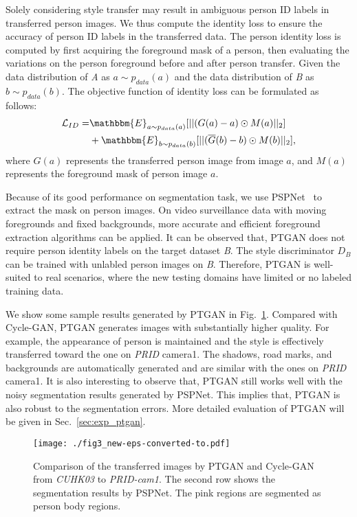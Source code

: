 \documentclass[10pt,twocolumn,letterpaper]{article}
\begin{document}
Solely considering style transfer may result in ambiguous person ID labels in transferred person images. We thus compute the identity loss to ensure the accuracy of person ID labels in the transferred data. The person identity loss is computed by first acquiring the foreground mask of a person, then evaluating the variations on the person foreground before and after person transfer. Given the data distribution of \emph{A} as $a \sim p_{data}(a)$ and the data distribution of \emph{B} as $b \sim p_{data}(b)$. The objective function of identity loss can be formulated as follows:
\begin{equation}
\begin{split}
\mathcal{L}_{ID} = &\mathbbm{E}_{a \sim p_{data}(a)}[||(G(a)-a) \odot M(a)||_2]\\
&+ \mathbbm{E}_{b \sim p_{data}(b)}[||(\overline{G}(b)-b) \odot M(b)||_2],
\end{split}
\end{equation}
where $G(a)$ represents the transferred person image from image $a$, and $M(a)$ represents the foreground mask of person image $a$.

Because of its good performance on segmentation task, we use PSPNet~\cite{zhao2017pspnet} to extract the mask on person images. On video surveillance data with moving foregrounds and fixed backgrounds, more accurate and efficient foreground extraction algorithms can be applied. It can be observed that, PTGAN does not require person identity labels on the target dataset \emph{B}. The style discriminator $D_B$ can be trained with unlabled person images on \emph{B}. Therefore, PTGAN is well-suited to real scenarios, where the new testing domains have limited or no labeled training data.

We show some sample results generated by PTGAN in Fig.~\ref{fig:fig3}. Compared with Cycle-GAN, PTGAN generates images with substantially higher quality. For example, the appearance of person is maintained and the style is effectively transferred toward the one on \emph{PRID} camera1. The shadows, road marks, and backgrounds are automatically generated and are similar with the ones on \emph{PRID} camera1. It is also interesting to observe that, PTGAN still works well with the noisy segmentation results generated by PSPNet. This implies that, PTGAN is also robust to the segmentation errors. More detailed evaluation of PTGAN will be given in Sec.~\ref{sec:exp_ptgan}.

\begin{figure}
\begin{center}
\texttt{[image: ./fig3\_new-eps-converted-to.pdf]}
\end{center}
\caption{Comparison of the transferred images by PTGAN and Cycle-GAN from \emph{CUHK03} to \emph{PRID-cam1}. The second row shows the segmentation results by PSPNet. The pink regions are segmented as person body regions.}
\label{fig:fig3}
\end{figure}
\end{document}
